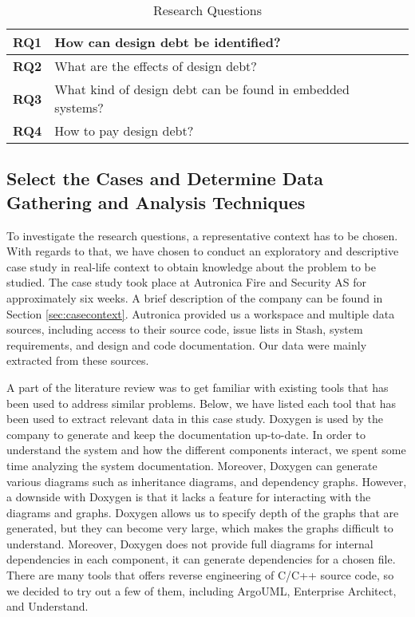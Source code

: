 \begin{table}[]
	\centering
	\caption{Research Questions}
	\label{researchQuestionsChapter3}
	\begin{tabular}{|l|p{8cm}|}
		\hline
		\textbf{RQ1} & How can design debt be identified?     \\ \hline
		\textbf{RQ2} & What are the effects of design debt?  \\ \hline
		\textbf{RQ3} & What kind of design debt can be found in embedded systems? \\ \hline
		\textbf{RQ4} & How to pay design debt? \\ \hline
	\end{tabular}
\end{table}



\subsection{Select the Cases and Determine Data Gathering and Analysis Techniques} %
To investigate the research questions, a representative context has to be chosen. With regards to that, we have chosen to conduct an exploratory and descriptive case study in real-life context to obtain knowledge about the problem to be studied. The case study took place at Autronica Fire and Security AS for approximately six weeks. A brief description of the company can be found in Section \ref{sec:casecontext}. Autronica provided us a workspace and multiple data sources, including access to their source code, issue lists in Stash, system requirements, and design and code documentation. Our data were mainly extracted from these sources.

A part of the literature review was to get familiar with existing tools that has been used to address similar problems. Below, we have listed each tool that has been used to extract relevant data in this case study. Doxygen is used by the company to generate and keep the documentation up-to-date. In order to understand the system and how the different components interact, we spent some time analyzing the system documentation. Moreover, Doxygen can generate various diagrams such as inheritance diagrams, and dependency graphs. However, a downside with Doxygen is that it lacks a feature for interacting with the diagrams and graphs. Doxygen allows us to specify depth of the graphs that are generated, but they can become very large, which makes the graphs difficult to understand. Moreover, Doxygen does not provide full diagrams for internal dependencies in each component, it can generate dependencies for a chosen file. There are many tools that offers reverse engineering of C/C++ source code, so we decided to try out a few of them, including ArgoUML, Enterprise Architect, and Understand. 

